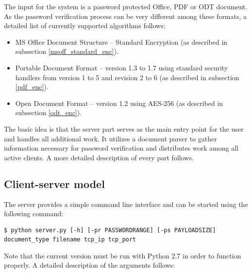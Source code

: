 \documentclass[11pt,oneside]{fithesis2}
\begin{document}
The input for the system is a password protected Office, PDF or ODT document. As the password verification process can be very different among these formats, a detailed list of currently supported algorithms follows:

\begin{itemize}
\setlength\itemsep{0.1em}
	\item{MS Office Document Structure -- Standard Encryption (as described in subsection \ref{msoff_standard_enc}).}
	\item{Portable Document Format --  version 1.3 to 1.7 using standard security handlers from version 1 to 5 and revision 2 to 6 (as described in subsection \ref{pdf_enc}).}
	\item{Open Document Format – version 1.2 using AES-256 (as described in subsection \ref{odt_enc}).}
\end{itemize}

The basic idea is that the server part serves as the main entry point for the user and handles all additional work. It utilizes a document parser to gather information necessary for password verification and distributes work among all active clients. A more detailed description of every part follows. 

\subsection{Client-server model}\label{client-server}

The server provides a simple command line interface and can be started using the following command: 

\begin{lstlisting}
$ python server.py [-h] [-pr PASSWORDRANGE] [-ps PAYLOADSIZE] document_type filename tcp_ip tcp_port
\end{lstlisting}

Note that the current version must be run with Python 2.7 in order to function properly. A detailed description of the arguments follows:
\end{document}
